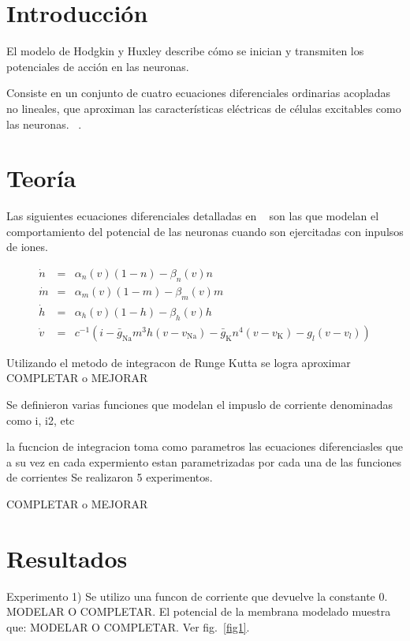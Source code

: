 \documentclass[aps,prl,twocolumn,groupedaddress]{revtex4-2}
\begin{document}
\section{Introducción}

El modelo de Hodgkin y Huxley describe cómo se inician y transmiten los potenciales de acción en las neuronas.

Consiste en un conjunto de cuatro ecuaciones diferenciales ordinarias acopladas no lineales, que aproximan las características eléctricas de células excitables como las neuronas.
~\cite{hertz1999introduction}.

\section{Teoría}

Las siguientes ecuaciones diferenciales
detalladas en ~\cite{hertz1999introduction}
son las  que modelan el comportamiento del potencial de las neuronas cuando son ejercitadas con inpulsos de iones.

\begin{eqnarray*}
\dot{n}&=&\alpha_n(v)(1-n)-\beta_n(v) n\\
\dot{m}&=&\alpha_m(v)(1-m)-\beta_m(v) m\\
\dot{h}&=&\alpha_h(v)(1-h)-\beta_h(v) h\\
\dot{v}&=&c^{-1}(i-\bar{g}_{\mathrm{Na}}m^3h(v-v_{\mathrm{Na}})-\bar{g}_{\mathrm{K}}n^4(v-v_{\mathrm{K}})-g_{l}(v-v_{l}))
\end{eqnarray*}

Utilizando el metodo de integracon de Runge Kutta se logra aproximar COMPLETAR o MEJORAR



Se definieron varias funciones que modelan el impuslo de corriente
 denominadas como i, i2, etc

 la fucncion de integracion toma como parametros las ecuaciones diferenciasles que a su vez en cada expermiento estan parametrizadas por cada una de las funciones de corrientes
 Se realizaron 5 experimentos.
 
COMPLETAR o MEJORAR

\section{Resultados}

Experimento 1) Se utilizo una funcon de corriente que devuelve la constante 0. MODELAR O COMPLETAR.
El potencial de la membrana modelado muestra que:
 MODELAR O COMPLETAR. Ver fig.~\ref{fig1}.\\
\end{document}
